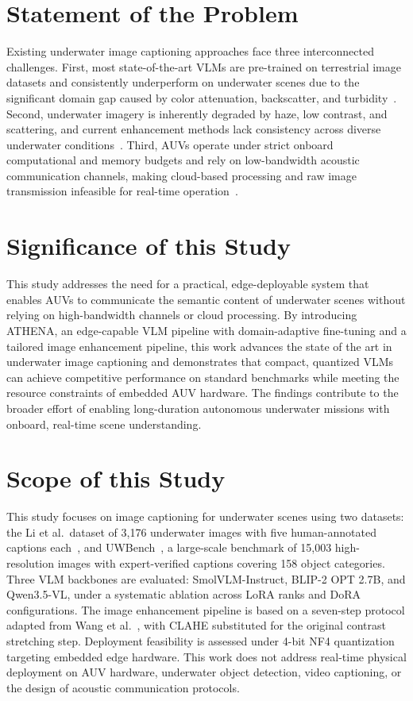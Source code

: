 \section{Statement of the Problem}

Existing underwater image captioning approaches face three interconnected challenges. First, most state-of-the-art VLMs are pre-trained on terrestrial image datasets and consistently underperform on underwater scenes due to the significant domain gap caused by color attenuation, backscatter, and turbidity~\cite{mainref}. Second, underwater imagery is inherently degraded by haze, low contrast, and scattering, and current enhancement methods lack consistency across diverse underwater conditions~\cite{7steppipeline}. Third, AUVs operate under strict onboard computational and memory budgets and rely on low-bandwidth acoustic communication channels, making cloud-based processing and raw image transmission infeasible for real-time operation~\cite{lowbandwith}.

\section{Significance of this Study}

This study addresses the need for a practical, edge-deployable system that enables AUVs to communicate the semantic content of underwater scenes without relying on high-bandwidth channels or cloud processing. By introducing ATHENA, an edge-capable VLM pipeline with domain-adaptive fine-tuning and a tailored image enhancement pipeline, this work advances the state of the art in underwater image captioning and demonstrates that compact, quantized VLMs can achieve competitive performance on standard benchmarks while meeting the resource constraints of embedded AUV hardware. The findings contribute to the broader effort of enabling long-duration autonomous underwater missions with onboard, real-time scene understanding.

\section{Scope of this Study}

This study focuses on image captioning for underwater scenes using two datasets: the Li et al.\ dataset of 3,176 underwater images with five human-annotated captions each~\cite{mainref}, and UWBench~\cite{uwbench}, a large-scale benchmark of 15,003 high-resolution images with expert-verified captions covering 158 object categories. Three VLM backbones are evaluated: SmolVLM-Instruct, BLIP-2 OPT 2.7B, and Qwen3.5-VL, under a systematic ablation across LoRA ranks and DoRA configurations. The image enhancement pipeline is based on a seven-step protocol adapted from Wang et al.~\cite{7steppipeline}, with CLAHE substituted for the original contrast stretching step. Deployment feasibility is assessed under 4-bit NF4 quantization targeting embedded edge hardware. This work does not address real-time physical deployment on AUV hardware, underwater object detection, video captioning, or the design of acoustic communication protocols.

